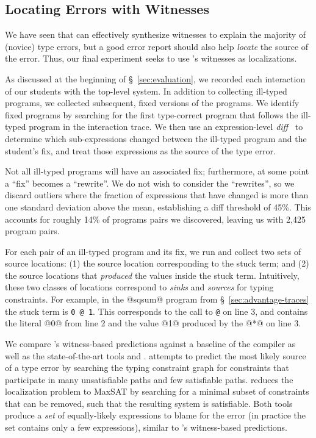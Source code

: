 
\subsection{Locating Errors with Witnesses}
\label{sec:locating}

We have seen that \toolname can effectively synthesize witnesses to
explain the majority of (novice) type errors, but a good error report
should also help \emph{locate} the source of the error.
%
Thus, our final experiment seeks to use \toolname's witnesses as
localizations.


As discussed at the beginning of \S~\ref{sec:evaluation}, we recorded
each interaction of our students with the \ocaml top-level system.
%
In addition to collecting ill-typed programs, we collected
subsequent, fixed versions of the programs.
%
We identify fixed programs by searching for the first type-correct
program that follows the ill-typed program in the interaction trace.
%
We then use an expression-level \emph{diff}~\cite{Lempsink2009-xf} to
determine which sub-expressions changed between the ill-typed program
and the student's fix, and treat those expressions as the source of the
type error.

Not all ill-typed programs will have an associated fix; furthermore,
at some point a ``fix'' becomes a ``rewrite''.
%
We do not wish to consider the ``rewrites'', so we discard outliers
where the fraction of expressions that have changed is more than one
standard deviation above the mean, establishing a diff threshold of
45\%.
%
This accounts for roughly 14\% of programs pairs we discovered, leaving
us with 2,425 program pairs.

For each pair of an ill-typed program and its fix, we run \toolname and
collect two sets of source locations:
%
(1) the source location corresponding to the stuck term; and
%
(2) the source locations that \emph{produced} the values inside the
stuck term.
%
Intuitively, these two classes of locations correspond to \emph{sinks}
and \emph{sources} for typing constraints.
%
For example, in the @sqsum@ program from \S~\ref{sec:advantage-traces}
the stuck term is \verb!0 @ 1!.
%
This corresponds to the call to \verb!@! on line 3, and contains
the literal @0@ from line 2 and the value @1@ produced by the
@*@ on line 3.

We compare \toolname's witness-based predictions against a baseline of
the \ocaml compiler as well as the state-of-the-art tools \sherrloc
and \mycroft.
%
\sherrloc attempts to predict the most likely source of a type error
by searching the typing constraint graph for constraints that participate
in many unsatisfiable paths and few satisfiable paths.
%
\mycroft reduces the localization problem to MaxSAT by searching for a
minimal subset of constraints that can be removed, such that the
resulting system is satisfiable.
%
Both tools produce a \emph{set} of equally-likely expressions to blame
for the error (in practice the set contains only a few expressions),
similar to \toolname's witness-based predictions.

